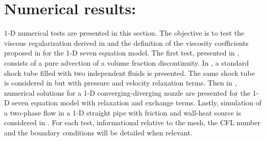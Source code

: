 \section{Numerical results:}\label{sec:1d-num-res-sect4}
$1$-D numerical tests are presented in this section. The objective is to test the viscous regularization derived in  and the definition of the viscosity coefficients proposed in  for the 1-D seven equation model. The first test, presented in ,  consists of a pure advection of a volume fraction discontinuity. In , a standard shock tube filled with two independent fluids is presented. The same shock tube is considered in  but with pressure and velocity relaxation terms. Then in , numerical solutions for a 1-D converging-diverging nozzle are presented for the 1-D seven equation model with relaxation and exchange terms. Lastly, simulation of a two-phase flow in a 1-D straight pipe with friction and wall-heat source is considered in . For each test, informational relative to the mesh, the CFL number and the boundary conditions will be detailed when relevant.

